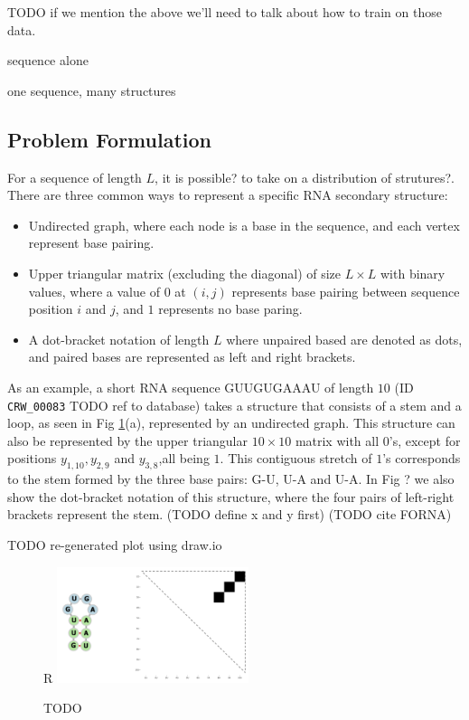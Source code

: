 \documentclass{article}
\begin{document}
TODO if we mention the above we'll need to talk about how to train on those data.

sequence alone

one sequence, many structures

\subsection{Problem Formulation}

For a sequence of length $L$, it is possible? to take on a distribution of strutures?.
There are three common ways to represent a specific RNA secondary structure:

\begin{itemize}

    \item Undirected graph, where each node is a base in the sequence, and each vertex represent base pairing.

    \item Upper triangular matrix (excluding the diagonal)
of size $L \times L$ with binary values, where a value of $0$ at $(i, j)$ represents
base pairing between sequence position $i$ and $j$, and $1$ represents no base paring.

    \item A dot-bracket notation of length $L$ where unpaired based are denoted as dots,
    and paired bases are represented as left and right brackets.

\end{itemize}

As an example, a short RNA sequence GUUGUGAAAU of length $10$ (ID \verb|CRW_00083| TODO ref to database) takes a structure that
consists of a stem and a loop, as seen in Fig \ref{fig:rna_ss_binary_mat}(a), represented by an undirected graph.
This structure can also be represented by the upper triangular $10 \times 10$ matrix with all $0$'s,
except for positions $y_{1, 10}, y_{2, 9}$ and $y_{3, 8}$,all being $1$.
This contiguous stretch of $1$'s corresponds to the stem formed by the three base pairs: G-U, U-A and U-A.
In Fig ? we also show the dot-bracket notation of this structure, where the four pairs
of left-right brackets represent the stem.
(TODO define x and y first)
(TODO cite FORNA)

TODO re-generated plot using draw.io

\begin{figure}{R}
        \centering
        \includegraphics[width=0.5\textwidth]{plot/rna_ss_binary_mat.png}
        \caption{TODO}
        \label{fig:rna_ss_binary_mat}
        \centering
\end{figure}
\end{document}
